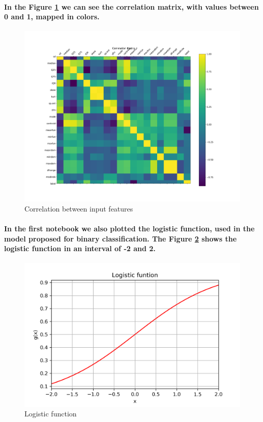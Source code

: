 \documentclass[a4paper]{article}
\begin{document}
\paragraph{In the Figure \ref{fig:pre-ex1-correlation} we can see the correlation matrix, with values between 0 and 1, mapped in colors.}

\begin{figure}[H]
    \includegraphics[width=15cm]{correlation}
    \caption{Correlation between input features}
    \label{fig:pre-ex1-correlation}
\end{figure}

\paragraph{In the first notebook we also plotted the logistic function, used in the model proposed for binary classification. The Figure \ref{fig:pre-ex1-logistic} shows the logistic function in an interval of -2 and 2.}

\begin{figure}[H]
    \centering
    \includegraphics[width=12cm]{logistic_function}
    \caption{Logistic function}
    \label{fig:pre-ex1-logistic}
\end{figure}
\end{document}
